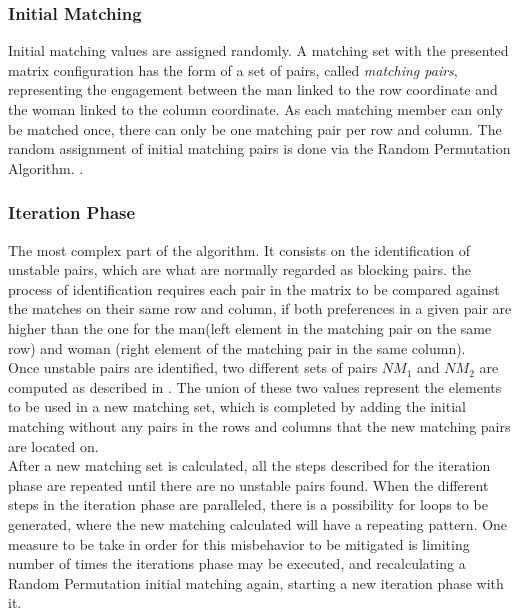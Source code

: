 \subsubsection{Initial Matching}
Initial matching values are assigned randomly. A matching set with the presented matrix configuration has the form of a set of pairs, called \textit{matching pairs}, representing the engagement between the man linked to the row coordinate and the woman linked to the column coordinate. As each matching member can only be matched once, there can only be one matching pair per row and column. The random assignment of initial matching pairs is done via the Random Permutation Algorithm. \cite{Durstenfeld}.
\subsubsection{Iteration Phase}
The most complex part of the algorithm. It consists on the identification of unstable pairs, which are what are normally regarded as blocking pairs. the process of identification requires each pair in the matrix to be compared against the matches on their same row and column, if both preferences in a given pair are higher than the one for the man(left element in the matching pair on the same row) and woman (right element of the matching pair in the same column).\\
Once unstable pairs are identified, two different sets of pairs $NM_1$ and $NM_2$ are computed as described in \cite{PII}. The union of these two values represent the elements to be used in a new matching set, which is completed by adding the initial matching without any pairs in the rows and columns that the new matching pairs are located on.\\
After a new matching set is calculated, all the steps described for the iteration phase are repeated until there are no unstable pairs found. When the different steps in the iteration phase are paralleled, there is a possibility for loops to be generated, where the new matching calculated will have a repeating pattern. One measure to be take in order for this misbehavior to be mitigated is limiting number of times the iterations phase may be executed, and recalculating a Random Permutation initial matching again, starting a new iteration phase with it.